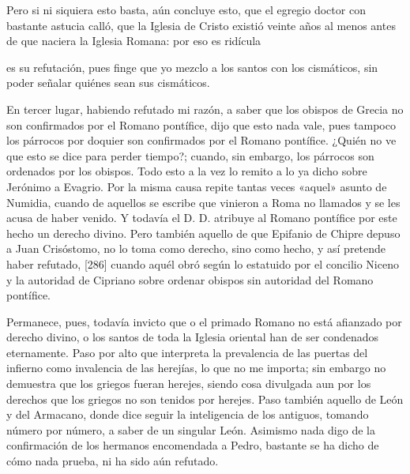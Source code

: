 Pero si ni siquiera esto basta, aún concluye esto, que el egregio doctor con bastante astucia calló, que la Iglesia de Cristo existió veinte años al menos antes de que naciera la Iglesia Romana: por eso es ridícula

es su refutación, pues finge que yo mezclo a los santos con los cismáticos, sin poder señalar quiénes sean sus cismáticos.

En tercer lugar, habiendo refutado mi razón, a saber que los obispos de Grecia no son confirmados por el Romano pontífice, dijo que esto nada vale, pues tampoco los párrocos por doquier son confirmados por el Romano pontífice. ¿Quién no ve que esto se dice para perder tiempo?; cuando, sin embargo, los párrocos son ordenados por los obispos. Todo esto a la vez lo remito a lo ya dicho sobre Jerónimo a Evagrio. Por la misma causa repite tantas veces «aquel» asunto de Numidia, cuando de aquellos se escribe que vinieron a Roma no llamados y se les acusa de haber venido. Y todavía el D. D. atribuye al Romano pontífice por este hecho un derecho divino. Pero también aquello de que Epifanio de Chipre depuso a Juan Crisóstomo, no lo toma como derecho, sino como hecho, y así pretende haber refutado, [286] cuando aquél obró según lo estatuido por el concilio Niceno y la autoridad de Cipriano sobre ordenar obispos sin autoridad del Romano pontífice.

Permanece, pues, todavía invicto que o el primado Romano no está afianzado por derecho divino, o los santos de toda la Iglesia oriental han de ser condenados eternamente. Paso por alto que interpreta la prevalencia de las puertas del infierno como invalencia de las herejías, lo que no me importa; sin embargo no demuestra que los griegos fueran herejes, siendo cosa divulgada aun por los derechos que los griegos no son tenidos por herejes. Paso también aquello de León y del Armacano, donde dice seguir la inteligencia de los antiguos, tomando número por número, a saber de un singular León. Asimismo nada digo de la confirmación de los hermanos encomendada a Pedro, bastante se ha dicho de cómo nada prueba, ni ha sido aún refutado.

